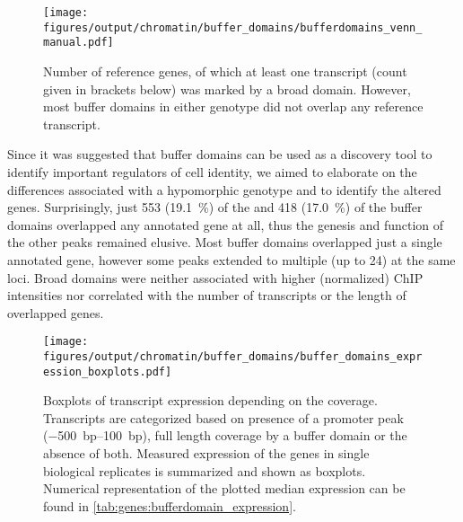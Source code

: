 \begin{figure}[!ht]
	\centering
	\texttt{[image: figures/output/chromatin/buffer\_domains/bufferdomains\_venn\_manual.pdf]} 
	\caption{Number of reference genes, of which at least one transcript (count given in brackets below) was marked by a broad \hisfourthree domain. However, most buffer domains in either genotype did not overlap any reference transcript.}
	\label{fig:genes:bufferdomains_venn.png}
\end{figure}

 
Since it was suggested that buffer domains can be used as a discovery tool to identify important regulators of cell identity\cite{Cao2017a}, we aimed to elaborate on the differences associated with a  hypomorphic genotype and to identify the altered genes. Surprisingly, just \num{553} (\SI{19,1}{\percent}) of the \dnmtwt and \num{418} (\SI{17,0}{\percent}) of the \dnmtchip buffer domains overlapped any annotated gene at all, thus the genesis and function of the other peaks remained elusive. Most buffer domains overlapped just a single annotated gene, however some peaks extended to multiple (up to \num{24}) at the same loci. Broad \hisfourthree domains were neither associated with higher (normalized) ChIP intensities nor correlated with the number of transcripts or the length of overlapped genes\dns. 

\begin{figure}[!ht]
	\texttt{[image: figures/output/chromatin/buffer\_domains/buffer\_domains\_expression\_boxplots.pdf]} 
	\caption{Boxplots of transcript expression depending on the \hisfourthree coverage. Transcripts are categorized based on presence of a promoter peak (\SIrange{-500}{100}{bp}), full length coverage by a buffer domain or the absence of both. Measured expression of the genes in single \kithi biological replicates is summarized and shown as boxplots. Numerical representation of the plotted median expression can be found in \autoref{tab:genes:bufferdomain_expression}.}
	\label{fig:genes:buffer_domains_expression_boxplots}
\end{figure}

